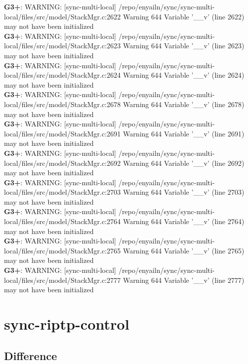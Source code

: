 \documentclass[12pt,twoside]{article}
\begin{document}
\textbf{G3+}: WARNING: [sync-multi-local] /repo/enyailn/sync/sync-multi-local/files/src/model/StackMgr.c:2622 Warning 644 Variable '\_\_v' (line 2622) may not have been initialized\\ 
\textbf{G3+}: WARNING: [sync-multi-local] /repo/enyailn/sync/sync-multi-local/files/src/model/StackMgr.c:2623 Warning 644 Variable '\_\_v' (line 2623) may not have been initialized\\ 
\textbf{G3+}: WARNING: [sync-multi-local] /repo/enyailn/sync/sync-multi-local/files/src/model/StackMgr.c:2624 Warning 644 Variable '\_\_v' (line 2624) may not have been initialized\\ 
\textbf{G3+}: WARNING: [sync-multi-local] /repo/enyailn/sync/sync-multi-local/files/src/model/StackMgr.c:2678 Warning 644 Variable '\_\_v' (line 2678) may not have been initialized\\ 
\textbf{G3+}: WARNING: [sync-multi-local] /repo/enyailn/sync/sync-multi-local/files/src/model/StackMgr.c:2691 Warning 644 Variable '\_\_v' (line 2691) may not have been initialized\\ 
\textbf{G3+}: WARNING: [sync-multi-local] /repo/enyailn/sync/sync-multi-local/files/src/model/StackMgr.c:2692 Warning 644 Variable '\_\_v' (line 2692) may not have been initialized\\ 
\textbf{G3+}: WARNING: [sync-multi-local] /repo/enyailn/sync/sync-multi-local/files/src/model/StackMgr.c:2703 Warning 644 Variable '\_\_v' (line 2703) may not have been initialized\\ 
\textbf{G3+}: WARNING: [sync-multi-local] /repo/enyailn/sync/sync-multi-local/files/src/model/StackMgr.c:2764 Warning 644 Variable '\_\_v' (line 2764) may not have been initialized\\ 
\textbf{G3+}: WARNING: [sync-multi-local] /repo/enyailn/sync/sync-multi-local/files/src/model/StackMgr.c:2765 Warning 644 Variable '\_\_v' (line 2765) may not have been initialized\\ 
\textbf{G3+}: WARNING: [sync-multi-local] /repo/enyailn/sync/sync-multi-local/files/src/model/StackMgr.c:2777 Warning 644 Variable '\_\_v' (line 2777) may not have been initialized\\ 
  
\section{sync-riptp-control} 
\subsection{Difference} 
  
\end{document}
